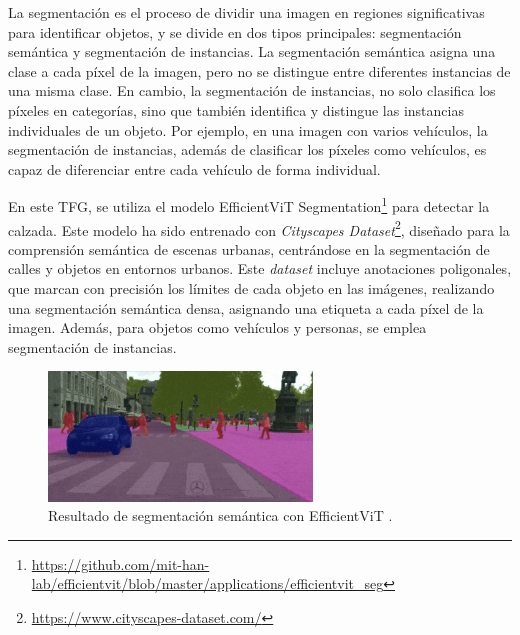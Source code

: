 La segmentación es el proceso de dividir una imagen en regiones significativas para identificar objetos, y se divide en dos tipos principales: segmentación semántica y segmentación de instancias. La segmentación semántica asigna una clase a cada píxel de la imagen, pero no se distingue entre diferentes instancias de una misma clase. En cambio, la segmentación de instancias, no solo clasifica los píxeles en categorías, sino que también identifica y distingue las instancias individuales de un objeto. Por ejemplo, en una imagen con varios vehículos, la segmentación de instancias, además de clasificar los píxeles como vehículos, es capaz de diferenciar entre cada vehículo de forma individual.

En este \ac{TFG}, se utiliza el modelo EfficientViT Segmentation\footnote{\url{https://github.com/mit-han-lab/efficientvit/blob/master/applications/efficientvit_seg}} para detectar la calzada. Este modelo ha sido entrenado con \textit{Cityscapes Dataset}\footnote{\url{https://www.cityscapes-dataset.com/}}, diseñado para la comprensión semántica de escenas urbanas, centrándose en la segmentación de calles y objetos en entornos urbanos. Este \textit{dataset} incluye anotaciones poligonales, que marcan con precisión los límites de cada objeto en las imágenes, realizando una segmentación semántica densa, asignando una etiqueta a cada píxel de la imagen. Además, para objetos como vehículos y personas, se emplea segmentación de instancias.

\begin{figure}[ht]
\begin{center}
\includegraphics[width=7cm]{figs/Plataformas_Desarollo/resultado_ef.png}
\end{center}
\caption{Resultado de segmentación semántica con EfficientViT \cite{efficientvit-gif}.}
\label{foto_ef}
\end{figure}

